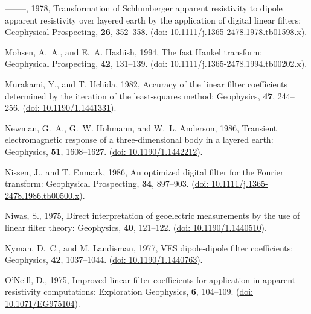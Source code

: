 \documentclass[paper,twocolumn,twoside]{geophysics}
\begin{document}
\begin{thebibliography}{}
--------, 1978, Transformation of {S}chlumberger apparent resistivity to dipole
  apparent resistivity over layered earth by the application of digital linear
  filters: Geophysical Prospecting, {\bf 26}, 352--358.
\newblock (\href{http://doi.org/10.1111/j.1365-2478.1978.tb01598.x}{doi:
  10.1111/j.1365-2478.1978.tb01598.x}).

Mohsen, A.~A., and E.~A. Hashish,  1994, The fast {H}ankel transform:
  Geophysical Prospecting, {\bf 42}, 131--139.
\newblock (\href{http://doi.org/10.1111/j.1365-2478.1994.tb00202.x}{doi:
  10.1111/j.1365-2478.1994.tb00202.x}).

Murakami, Y., and T. Uchida,  1982, Accuracy of the linear filter coefficients
  determined by the iteration of the least-squares method: Geophysics, {\bf
  47}, 244--256.
\newblock (\href{https://doi.org/10.1190/1.1441331}{doi: 10.1190/1.1441331}).

Newman, G.~A., G.~W. Hohmann, and W.~L. Anderson,  1986, Transient
  electromagnetic response of a three-dimensional body in a layered earth:
  Geophysics, {\bf 51}, 1608--1627.
\newblock (\href{http://doi.org/10.1190/1.1442212}{doi: 10.1190/1.1442212}).

Nissen, J., and T. Enmark,  1986, An optimized digital filter for the {F}ourier
  transform: Geophysical Prospecting, {\bf 34}, 897--903.
\newblock (\href{http://doi.org/10.1111/j.1365-2478.1986.tb00500.x}{doi:
  10.1111/j.1365-2478.1986.tb00500.x}).

Niwas, S.,  1975, Direct interpretation of geoelectric measurements by the use
  of linear filter theory: Geophysics, {\bf 40}, 121--122.
\newblock (\href{https://doi.org/10.1190/1.1440510}{doi: 10.1190/1.1440510}).

Nyman, D.~C., and M. Landisman,  1977, {VES} dipole-dipole filter coefficients:
  Geophysics, {\bf 42}, 1037--1044.
\newblock (\href{https://doi.org/10.1190/1.1440763}{doi: 10.1190/1.1440763}).

O'Neill, D.,  1975, Improved linear filter coefficients for application in
  apparent resistivity computations: Exploration Geophysics, {\bf 6}, 104--109.
\newblock (\href{http://library.seg.org/doi/abs/10.1071/EG975104}{doi:
  10.1071/EG975104}).


\end{thebibliography}
\end{document}
